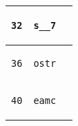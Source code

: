 \documentclass{ti2}
\begin{document}
\begin{tabular}{ | l | l | l|}
\begin{lstlisting}
32
\end{lstlisting} &
\begin{lstlisting}
s__7
\end{lstlisting} &
\begin{lstlisting}
\end{lstlisting} \\ \hline

\begin{lstlisting}
36
\end{lstlisting} &
\begin{lstlisting}
ostr
\end{lstlisting} &
\begin{lstlisting}
\end{lstlisting} \\ \hline

\begin{lstlisting}
40
\end{lstlisting} &
\begin{lstlisting}
eamc
\end{lstlisting} &
\begin{lstlisting}
\end{lstlisting} \\ \hline


\end{tabular}
\end{document}
